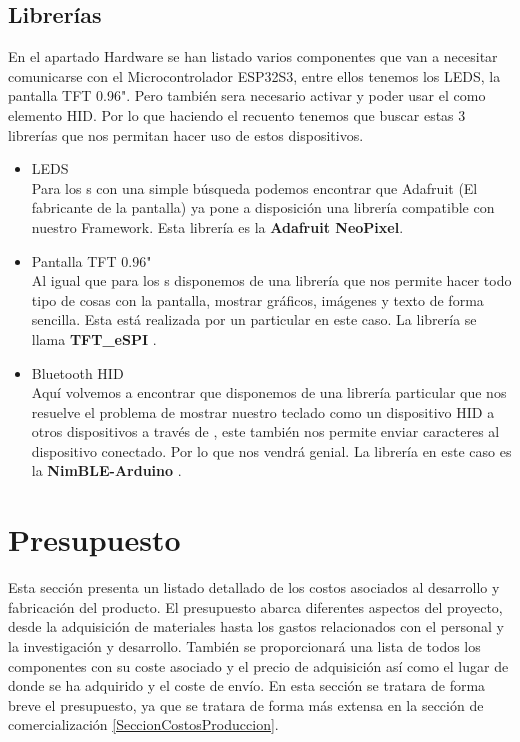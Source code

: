 \subsection{Librerías}
En el apartado Hardware se han listado varios componentes que van a necesitar comunicarse con el Microcontrolador ESP32S3, entre ellos tenemos los \gls{LED}S, la pantalla \gls{TFT} 0.96". Pero también sera necesario activar y poder usar el  como elemento \gls{HID}. Por lo que haciendo el recuento tenemos que buscar estas 3 librerías que nos permitan hacer uso de estos dispositivos.
\begin{itemize}
    \item \gls{LED}S\\
    Para los s con una simple búsqueda podemos encontrar que Adafruit (El fabricante de la pantalla) ya pone a disposición una librería compatible con nuestro Framework. Esta librería es la \textbf{Adafruit NeoPixel}.
    \item Pantalla \gls{TFT} 0.96"\\
    Al igual que para los s disponemos de una librería que nos permite hacer todo tipo de cosas con la pantalla, mostrar gráficos, imágenes y texto de forma sencilla. Esta está realizada por un particular en este caso. La librería se llama \textbf{TFT\_eSPI} \cite{TFTLib}.
    \item Bluetooth \gls{HID}\\
    Aquí volvemos a encontrar que disponemos de una librería particular que nos resuelve el problema de mostrar nuestro teclado como un dispositivo \gls{HID} a otros dispositivos a través de , este también nos permite enviar caracteres al dispositivo conectado. Por lo que nos vendrá genial. La librería en este caso es la \textbf{NimBLE-Arduino} \cite{NimbleLib}.
\end{itemize}

\section{Presupuesto}
Esta sección presenta un listado detallado de los costos asociados al desarrollo y fabricación del producto. El presupuesto abarca diferentes aspectos del proyecto, desde la adquisición de materiales hasta los gastos relacionados con el personal y la investigación y desarrollo. También se proporcionará una lista de todos los componentes con su coste asociado y el precio de adquisición así como el lugar de donde se ha adquirido y el coste de envío. En esta sección se tratara de forma breve el presupuesto, ya que se tratara de forma más extensa en la sección de comercialización \ref{SeccionCostosProduccion}.

